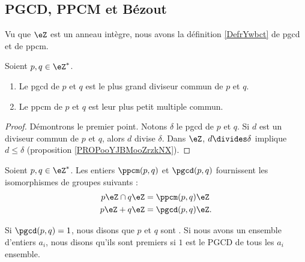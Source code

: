 \subsection{PGCD, PPCM et Bézout}

Vu que \( \eZ\) est un anneau intègre, nous avons la définition \ref{DefrYwbct} de pgcd et de ppcm.
\begin{proposition}       \label{PROPooAVRGooUfhjwF}
    Soient \( p,q\in\eZ^*\). 
    \begin{enumerate}
        \item
            Le pgcd de \( p\) et \( q\) est le plus grand diviseur commun de \( p\) et \( q\). 
        \item
            Le ppcm de \( p\) et \( q\) est leur plus petit multiple commun.
    \end{enumerate}
\end{proposition}

\begin{proof}
    Démontrons le premier point. Notons \( \delta\) le pgcd de \( p\) et \( q\). Si \( d\) est un diviseur commun de \( p\) et \( q\), alors \( d\) divise \( \delta\). Dans \( \eZ\), \( d\divides \delta\) implique \( d\leq\delta\) (proposition \ref{PROPooYJBMooZrzkNX}).
\end{proof}

\begin{lemma}
    Soient \( p,q\in\eZ^*\). Les entiers \( \ppcm(p,q)\) et \( \pgcd(p,q)\) fournissent les isomorphismes de groupes suivants :
\begin{subequations}
    \begin{align}
        p\eZ\cap q\eZ&=\ppcm(p,q)\eZ\\
        p\eZ + q\eZ&=\pgcd(p,q)\eZ.
    \end{align}
\end{subequations}
\end{lemma}

\begin{definition}  \label{DefZHRXooNeWIcB}
    Si \( \pgcd(p,q)=1\), nous disons que \( p\) et \( q\) sont . Si nous avons un ensemble d'entiers \( a_i\), nous disons qu'ils sont premiers  si \( 1\) est le PGCD de tous les \( a_i\) ensemble.
\end{definition}

